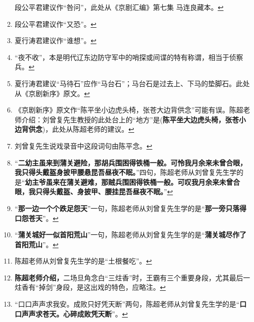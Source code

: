 \begin{enumerate}
  段公平君建议作``咎问''，此处从《京剧汇编》第七集
  马连良藏本。\protect\hyperlink{fnref113}{↩}
\item
  \leavevmode\hypertarget{fn114}{}%
  段公平君建议作``又恐''。\protect\hyperlink{fnref114}{↩}
\item
  \leavevmode\hypertarget{fn115}{}%
  夏行涛君建议作``谁想''。\protect\hyperlink{fnref115}{↩}
\item
  \leavevmode\hypertarget{fn116}{}%
  ``夜不收''，本是明代辽东边防守军中的哨探或间谍的特有称谓，相当于侦察兵。\protect\hyperlink{fnref116}{↩}
\item
  \leavevmode\hypertarget{fn117}{}%
  夏行涛君建议``马待石''应作``马台石''；马台石是过去上、下马的垫脚石。此处从《京剧新序》原文。\protect\hyperlink{fnref117}{↩}
\item
  \leavevmode\hypertarget{fn118}{}%
  《京剧新序》原文作``陈平坐小边虎头椅，张苍大边背供念''可能有误。陈超老师介绍：刘曾复先生教授的此处台上的``地方''是(\textbf{陈平坐大边虎头椅，张苍小边背供念})，此处从陈超老师的建议。\protect\hyperlink{fnref118}{↩}
\item
  \leavevmode\hypertarget{fn119}{}%
  刘曾复先生说戏录音中这段词句由陈平念。\protect\hyperlink{fnref119}{↩}
\item
  \leavevmode\hypertarget{fn120}{}%
  ``\textbf{二幼主虽来到蒲关避险，那胡兵围困得铁桶一般。可怜我月余来未曾合眼，我只得头戴盔身披甲腰悬昆吾昼夜不眠。}''四句，陈超老师从刘曾复先生学的是``\textbf{幼主爷虽来在蒲关避难，那贼兵围困得铁桶一般。可叹我月余来未曾合眼，我只得头戴盔、身披甲、腰挂昆吾昼夜不眠。}''\protect\hyperlink{fnref120}{↩}
\item
  \leavevmode\hypertarget{fn121}{}%
  ``\textbf{那一边一个个跌足怨天}''一句，陈超老师从刘曾复先生学的是``\textbf{那一旁只落得口怨苍天}''。\protect\hyperlink{fnref121}{↩}
\item
  \leavevmode\hypertarget{fn122}{}%
  ``\textbf{蒲关城好一似首阳荒山}''一句，陈超老师从刘曾复先生学的是``\textbf{蒲关城尽作了首阳荒山}''。\protect\hyperlink{fnref122}{↩}
\item
  \leavevmode\hypertarget{fn123}{}%
  陈超老师从刘曾复先生学的是``土根餐吃''。\protect\hyperlink{fnref123}{↩}
\item
  \leavevmode\hypertarget{fn124}{}%
  \textbf{陈超老师介绍，}二场旦角念白``三炷香''时，王霸有三个重要身段，尤其最后一炷香有``掉剑''身段，是这出戏的特色，应略注。\protect\hyperlink{fnref124}{↩}
\item
  \leavevmode\hypertarget{fn125}{}%
  ``口口声声求我安。成败只好凭天断''两句，陈超老师从刘曾复先生学的是``\textbf{口口声声求苍天。心碎成败凭天断}''。\protect\hyperlink{fnref125}{↩}

\end{enumerate}
